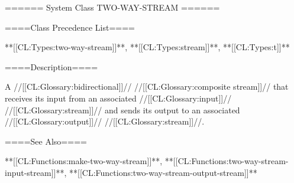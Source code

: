 ====== System Class TWO-WAY-STREAM ======

====Class Precedence List====

**[[CL:Types:two-way-stream]]**, **[[CL:Types:stream]]**, **[[CL:Types:t]]**

====Description====

A //[[CL:Glossary:bidirectional]]// //[[CL:Glossary:composite stream]]// that receives its input from an associated //[[CL:Glossary:input]]// //[[CL:Glossary:stream]]// and sends its output to an associated //[[CL:Glossary:output]]// //[[CL:Glossary:stream]]//.

====See Also====

**[[CL:Functions:make-two-way-stream]]**, **[[CL:Functions:two-way-stream-input-stream]]**, **[[CL:Functions:two-way-stream-output-stream]]**

 
